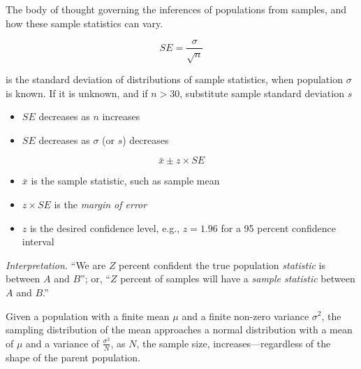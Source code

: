 
The body of thought governing the inferences of populations from samples,
and how these sample statistics can vary.
\hformbar




\begin{equation}
	SE = \frac{\sigma}{\sqrt{n}}
\end{equation}

is the standard deviation of distributions of sample statistics, when population $\sigma$ is known. If it is unknown, and if $n > 30$, substitute sample standard deviation $s$

\begin{itemize}
	\item $SE$ decreases as $n$ increases
	\item $SE$ decreases as $\sigma$ (or $s$) decreases
\end{itemize}
\hformbar




\begin{equation}
	\bar{x} \pm z \times SE
\end{equation}

\begin{itemize}
	\item $\bar{x}$ is the sample statistic, such as sample mean
	\item $z \times SE$ is the \textit{margin of error}
	\item $z$ is the desired confidence level, e.g., $z = 1.96$ for a 95 percent confidence interval
\end{itemize}

\textit{Interpretation.} ``We are $Z$ percent confident the true population \textit{statistic} is between $A$ and $B$''; or, ``$Z$ percent of samples will have a \textit{sample statistic} between $A$ and $B$.''

\hformbar




Given a population with a finite mean $\mu$ and a finite non-zero variance
$\sigma^2$, the sampling distribution of the mean approaches a normal
distribution with a mean of $\mu$ and a variance of $\frac{\sigma^2}{N}$, as
$N$, the sample size, increases---regardless of the shape of the parent population.
\hformbar




